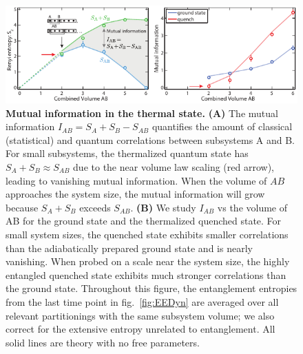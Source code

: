 \begin{figure}[t]
	\centering
	\includegraphics[width=140mm]{figures/ETH_MI.pdf}
	\caption{{\bf Mutual information in the thermal state. } {\bf (A)} The mutual information $I_{AB} = S_A + S_B - S_{AB}$ quantifies the amount of classical (statistical) and quantum correlations between subsystems A and B. For small subsystems, the thermalized quantum state has $S_A + S_B \approx S_{AB}$ due to the near volume law scaling (red arrow), leading to vanishing mutual information. When the volume of $AB$ approaches the system size, the mutual information will grow because $S_A + S_B$ exceeds $S_{AB}$. {\bf (B)} We study $I_{AB}$ vs the volume of AB for the ground state and the thermalized quenched state. For small system sizes, the quenched state exhibits smaller correlations than the adiabatically prepared ground state and is nearly vanishing. When probed on a scale near the system size, the highly entangled quenched state exhibits much stronger correlations than the ground state. Throughout this figure, the entanglement entropies from the last time point in fig.~\ref{fig:EEDyn} are averaged over all relevant partitionings with the same subsystem volume; we also correct for the extensive entropy unrelated to entanglement. All solid lines are theory with no free parameters.}
	\label{fig:MI}
\end{figure} 

